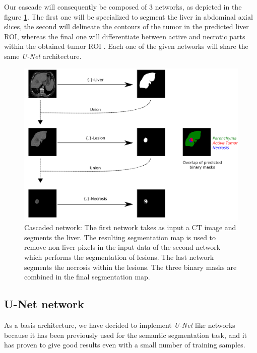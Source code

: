 \documentclass[]{article}
\begin{document}
Our cascade will consequently be composed of 3 networks, as depicted
 in the figure \ref{CARS_Cascade}. The first one will be specialized to segment the liver in
abdominal axial slices, the second will delineate the contours of the
tumor in the predicted liver ROI, whereas the final one will
differentiate between active and necrotic parts within the obtained
tumor ROI \cite{Ouhmich2019}.
Each one of the given networks will share the same \emph{U-Net}
architecture.

\begin{figure}[th!]
	\centering
	\includegraphics[width=0.7\linewidth]{images/image26}
	\caption{Cascaded network: The first network takes as input a CT image and segments the liver. The resulting segmentation map is used to remove non-liver pixels in the input data of the second network which performs the segmentation of lesions. The last network segments the necrosis within the lesions. The three binary masks are combined in the final segmentation map.}
	\label{CARS_Cascade}
\end{figure}


\subsection*{U-Net network}

As a basis architecture, we have decided to implement \emph{U-Net} like
networks because it has been previously used for the semantic
segmentation task, and it has proven to give good results even with a
small number of training samples.
\end{document}
